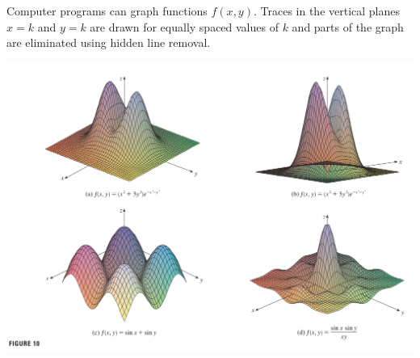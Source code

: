 \documentclass{article}
\begin{document}
\pagebreak
Computer programs can graph functions $f(x,y)$. Traces in the vertical planes $x = k$ and $y = k$ are drawn for equally spaced values of $k$ and parts of the graph are eliminated using hidden line removal.
\begin{center}
  \includegraphics[width = 15 cm]{./images/blender.png} 
\end{center}
\end{document}
